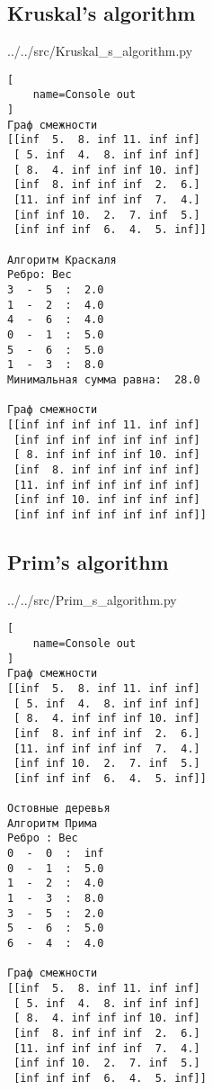 \newpage

\subsection{Kruskal's algorithm}


{../../src/Kruskal_s_algorithm.py}

\begin{lstlisting}[
    name=Console out
]
Граф смежности
[[inf  5.  8. inf 11. inf inf]
 [ 5. inf  4.  8. inf inf inf]
 [ 8.  4. inf inf inf 10. inf]
 [inf  8. inf inf inf  2.  6.]
 [11. inf inf inf inf  7.  4.]
 [inf inf 10.  2.  7. inf  5.]
 [inf inf inf  6.  4.  5. inf]]

Алгоритм Краскаля
Ребро: Вес
3  -  5  :  2.0
1  -  2  :  4.0
4  -  6  :  4.0
0  -  1  :  5.0
5  -  6  :  5.0
1  -  3  :  8.0
Mинимальная сумма равна:  28.0

Граф смежности
[[inf inf inf inf 11. inf inf]
 [inf inf inf inf inf inf inf]
 [ 8. inf inf inf inf 10. inf]
 [inf  8. inf inf inf inf inf]
 [11. inf inf inf inf inf inf]
 [inf inf 10. inf inf inf inf]
 [inf inf inf inf inf inf inf]]
\end{lstlisting}

\newpage

\subsection{Prim's algorithm}


{../../src/Prim_s_algorithm.py}

\begin{lstlisting}[
    name=Console out
]
Граф смежности
[[inf  5.  8. inf 11. inf inf]
 [ 5. inf  4.  8. inf inf inf]
 [ 8.  4. inf inf inf 10. inf]
 [inf  8. inf inf inf  2.  6.]
 [11. inf inf inf inf  7.  4.]
 [inf inf 10.  2.  7. inf  5.]
 [inf inf inf  6.  4.  5. inf]]

Остовные деревья
Алгоритм Прима
Ребро : Вес
0  -  0  :  inf
0  -  1  :  5.0
1  -  2  :  4.0
1  -  3  :  8.0
3  -  5  :  2.0
5  -  6  :  5.0
6  -  4  :  4.0

Граф смежности
[[inf  5.  8. inf 11. inf inf]
 [ 5. inf  4.  8. inf inf inf]
 [ 8.  4. inf inf inf 10. inf]
 [inf  8. inf inf inf  2.  6.]
 [11. inf inf inf inf  7.  4.]
 [inf inf 10.  2.  7. inf  5.]
 [inf inf inf  6.  4.  5. inf]]
\end{lstlisting}

